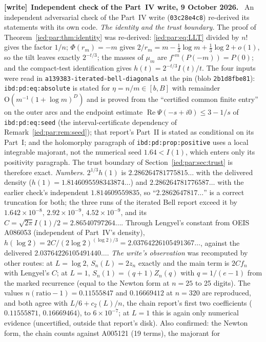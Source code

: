 \documentclass[11pt,letterpaper]{article}
\theoremstyle{remark}\newtheorem{remark}[theorem]{Remark}
\newcommand{\Oh}{\mathrm O}\newcommand{\supp}{\operatorname{supp}}
\newcommand{\Rea}{\operatorname{Re}}\newcommand{\Ima}{\operatorname{Im}}
\newcommand{\file}[1]{\nolinkurl{#1}}
\newenvironment{writenote}[1][]{\par\smallskip\begingroup\small
 \noindent\textbf{[write]}\if\relax\detokenize{#1}\relax\else~\textbf{#1.}\fi\ }%
 {\par\endgroup\smallskip}
\begin{document}
\begin{writenote}[Independent check of the Part~IV write, 9 October 2026]
An independent adversarial check of the Part~IV write (\file{03c28e4c8}) re-derived its
statements with its own code. \emph{The identity and the trust boundary.} The proof of
Theorem~\ref{ied:par:thm:identity} was re-derived: \eqref{ied:par:eq:LLT} divided by $n!$
gives the factor $1/n$; $\Phi(r_m)=-m$ gives $2/r_m=m-\frac13\log m+\frac13\log2+o(1)$, so
the tilt leaves exactly $2^{-t/3}$; the masses of $\mu_m$ are $f^{\circ m}(P(-m))=P(0)$; and
the compact-test identification gives $h(t)=2^{-t/3}I(t)/t$. The four inputs were read in
\file{a139383-iterated-bell-diagonals} at the pin (blob \file{2b1d8fbe81}):
\file{ibd:pd:eq:absolute} is stated for $\eta=n/m\in[b,B]$ with remainder
$\Oh(m^{-1}(1+\log m)^D)$ and is proved from the ``certified common finite entry'' on the
outer arcs and the endpoint estimate $\Rea\Psi(-s+i0)\le3-1/s$ of \file{ibd:pd:eq:seed}
(the interval-certificate dependency of Remark~\ref{ied:par:rem:seed}); that report's Part~II
is stated as conditional on its Part~I; and the holomorphy paragraph of
\file{ibd:pd:prop:positive} uses a local integrable majorant, not the numerical seed
$1.64<I(1)$, which enters only its positivity paragraph. The trust boundary of
Section~\ref{ied:par:sec:trust} is therefore exact. \emph{Numbers.} $2^{1/3}h(1)$ is
$2.286264781775815\ldots$ with the delivered density ($h(1)=1.8146095598343874\ldots$) and
$2.286264781776587\ldots$ with the earlier check's independent $1.814609559835$, so
``$2.2862647817\ldots$'' is a correct truncation for both; the three runs of the iterated Bell
report exceed it by $1.642\times10^{-8}$, $2.92\times10^{-9}$, $4.52\times10^{-9}$, and its
$C=\sqrt{2\pi}I(1)/2=2.86540797264\ldots$. Through Lengyel's constant from OEIS A086053
(independent of Part~IV's density), $h(\log2)=2C/(2\log2)^{(\log2)/3}=2.03764226105491367\ldots$,
against the delivered $2.03764226105491440\ldots$. \emph{The write's observation} was
recomputed by other routes: at $L=\log2$, $S_n(L)=2z_n$ exactly and the main term is $2Cf_n$
with Lengyel's $C$; at $L=1$, $S_n(1)=(q+1)Z_n(q)$ with $q=1/(e-1)$ from the marked recurrence
(equal to the Newton form at $n=25$ to 25 digits). The values $n(\text{ratio}-1)=0.11555847$
and $0.16669412$ at $n=320$ are reproduced, and both agree with $L/6+c_2(L)/n$, the chain
report's first two coefficients ($0.11555871$, $0.16669464$), to $6\times10^{-7}$; at $L=1$
this is again only numerical evidence (uncertified, outside that report's disk). Also
confirmed: the Newton form, the chain counts against A005121 (19 terms), the majorant for

\end{writenote}
\end{document}

